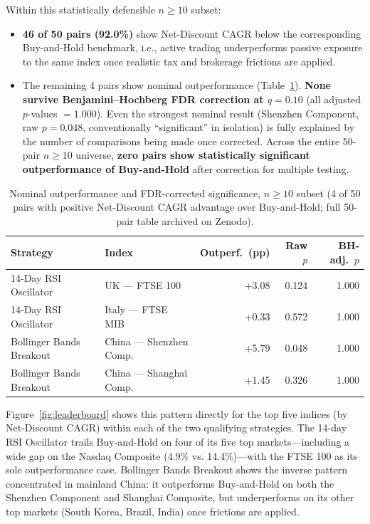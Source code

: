 \documentclass[11pt]{article}
\begin{document}
Within this statistically defensible $n \geq 10$ subset:

\begin{itemize}
    \item \textbf{46 of 50 pairs (92.0\%)} show Net-Discount CAGR below the corresponding Buy-and-Hold benchmark, i.e., active trading underperforms passive exposure to the same index once realistic tax and brokerage frictions are applied.
    \item The remaining 4 pairs show nominal outperformance (Table~\ref{tab:fdr}). \textbf{None survive Benjamini--Hochberg FDR correction at $q=0.10$} (all adjusted $p$-values $=1.000$). Even the strongest nominal result (Shenzhen Component, raw $p=0.048$, conventionally ``significant'' in isolation) is fully explained by the number of comparisons being made once corrected. Across the entire 50-pair $n \geq 10$ universe, \textbf{zero pairs show statistically significant outperformance of Buy-and-Hold} after correction for multiple testing.
\end{itemize}

\begin{table}[htbp]
    \centering
    \caption{Nominal outperformance and FDR-corrected significance, $n\geq10$ subset (4 of 50 pairs with positive Net-Discount CAGR advantage over Buy-and-Hold; full 50-pair table archived on Zenodo).}
    \label{tab:fdr}
    \begin{tabular}{@{}llrrr@{}}
        \toprule
        Strategy & Index & Outperf.\ (pp) & Raw $p$ & BH-adj.\ $p$ \\
        \midrule
        14-Day RSI Oscillator      & UK --- FTSE 100          & +3.08 & 0.124 & 1.000 \\
        14-Day RSI Oscillator      & Italy --- FTSE MIB       & +0.33 & 0.572 & 1.000 \\
        Bollinger Bands Breakout   & China --- Shenzhen Comp. & +5.79 & 0.048 & 1.000 \\
        Bollinger Bands Breakout   & China --- Shanghai Comp. & +1.45 & 0.326 & 1.000 \\
        \bottomrule
    \end{tabular}
\end{table}

Figure~\ref{fig:leaderboard} shows this pattern directly for the top five indices (by Net-Discount CAGR) within each of the two qualifying strategies. The 14-day RSI Oscillator trails Buy-and-Hold on four of its five top markets---including a wide gap on the Nasdaq Composite (4.9\% vs. 14.4\%)---with the FTSE 100 as its sole outperformance case. Bollinger Bands Breakout shows the inverse pattern concentrated in mainland China: it outperforms Buy-and-Hold on both the Shenzhen Component and Shanghai Composite, but underperforms on its other top markets (South Korea, Brazil, India) once frictions are applied.
\end{document}
